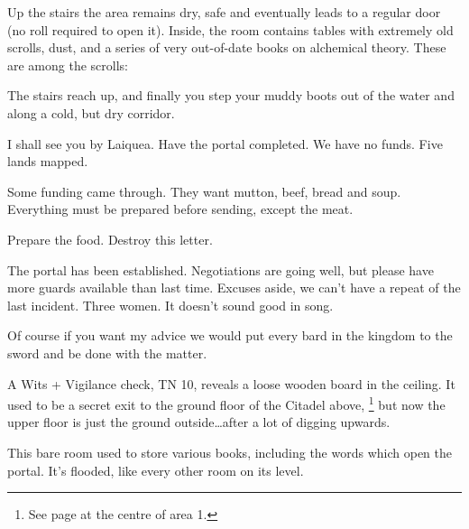 \begin{multicols}{2}

Up the stairs the area remains dry, safe and eventually leads to a regular door (no roll required to open it).  Inside, the room contains tables with extremely old scrolls, dust, and a series of very out-of-date books on alchemical theory.  These are among the scrolls:

\begin{boxtext}

  The stairs reach up, and finally you step your muddy boots out of the water and along a cold, but dry corridor.

\end{boxtext}

\begin{exampletext}

  I shall see you by Laiquea.  Have the portal completed.  We have no funds.  Five lands mapped.

\end{exampletext}

\begin{exampletext}

  Some funding came through.  They want mutton, beef, bread and soup.  Everything must be prepared before sending, except the meat.

  Prepare the food.  Destroy this letter.

\end{exampletext}

\begin{exampletext}

  The portal has been established.  Negotiations are going well, but please have more guards available than last time.  Excuses aside, we can't have a repeat of the last incident.  Three women.  It doesn't sound good in song.

  Of course if you want my advice we would put every bard in the kingdom to the sword and be done with the matter.

\end{exampletext}

A Wits + Vigilance check, TN 10, reveals a loose wooden board in the ceiling.
It used to be a secret exit to the ground floor of the Citadel above,%
\footnote{See page \pageref{fallen_tower} at the centre of area 1.}
but now the upper floor is just the ground outside\ldots after a lot of digging upwards.


This bare room used to store various books, including the words which open the portal.  It's flooded, like every other room on its level.


\end{multicols}
